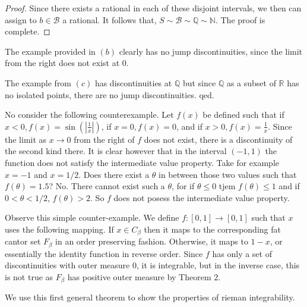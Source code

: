 \documentclass[letter]{article}
\newenvironment{menumerate}{%
  \edef\backupindent{\the\parindent}%
  \enumerate%
  \setlength{\parindent}{\backupindent}%
}{\endenumerate}
\begin{document}
\begin{menumerate}
\begin{proof}
		Since there exists a rational in each of these disjoint intervals, we then can assign to $b\in \mathcal{B}$ a rational. It follows that, $S \sim \mathcal{B} \sim \mathbb{Q} \sim \mathbb{N}.$ The proof is complete.
	\end{proof}

	The example provided in $(b)$ clearly has no jump discontinuities, since the limit from the right does not exist at $0.$

	The example from $(c)$ has discontinuities at $\mathbb{Q}$ but since $\mathbb{Q}$ as a subset of $\mathbb{R}$ has no isolated points, there are no jump discontinuities. qed.


\item No consider the following counterexample. Let $f(x)$ be defined such that if $x < 0, f(x)  = \sin(|\frac{1}{x}|)$, if $x = 0, f(x) = 0$, and if $x > 0, f(x) = \frac{1}{x}.$ Since the limit as $x \to 0$ from the right of $f$ does not exist, there is a discontinuity of the second kind there. It is clear however that in the interval $(-1,1)$ the function does not satisfy the intermediate value property. Take for example $x = -1$ and $x=1/2$. Does there exist a $\theta$ in between those two values such that $f(\theta) = 1.5$? No. There cannot exist such a $\theta$, for if $\theta \leq 0$ tjem $f(\theta) \leq 1$ and if $0 < \theta < 1/2$, $f(\theta) > 2.$ So $f$ does not posess the intermediate value property.


\setcounter{enumi}{49}
\item Observe this simple counter-example. We define $f : [0,1] \to [0,1]$ such that $x$ uses the following mapping. If $x \in C_\beta$ then it maps to the corresponding fat cantor set $F_\beta$ in an order preserving fashion. Otherwise, it maps to $1-x$, or essentially the identity function in reverse order. Since $f$ has only a set of discontinuities with outer measure $0$, it is integrable, but in the inverse case, this is not true as $F_\beta$ has positive outer measure by Theorem $2$.

\setcounter{enumi}{51}
\item We use this first general theorem to show the properties of rieman integrability.


\end{menumerate}
\end{document}
